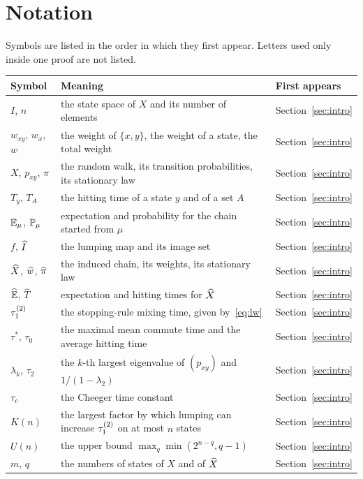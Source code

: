 \section{Notation}\label{app:notation}
Symbols are listed in the order in which they first appear. Letters used only inside one proof are not listed.

\medskip
\begin{center}
\small
\begin{tabular}{@{}lp{}l@{}}
\toprule
Symbol & Meaning & First appears\\
\midrule
$I$, $n$ & the state space of $X$ and its number of elements & Section~\ref{sec:intro}\\
$w_{xy}$, $w_x$, $w$ & the weight of $\{x,y\}$, the weight of a state, the total weight & Section~\ref{sec:intro}\\
$X$, $p_{xy}$, $\pi$ & the random walk, its transition probabilities, its stationary law & Section~\ref{sec:intro}\\
$T_y$, $T_A$ & the hitting time of a state $y$ and of a set $A$ & Section~\ref{sec:intro}\\
$\mathbb{E}_\mu$, $\mathbb{P}_\mu$ & expectation and probability for the chain started from $\mu$ & Section~\ref{sec:intro}\\
$f$, $\widehat{I}$ & the lumping map and its image set & Section~\ref{sec:intro}\\
$\widehat{X}$, $\widehat{w}$, $\widehat{\pi}$ & the induced chain, its weights, its stationary law & Section~\ref{sec:intro}\\
$\widehat{\mathbb{E}}$, $\widehat T$ & expectation and hitting times for $\widehat{X}$ & Section~\ref{sec:intro}\\
$\tau_1^{(2)}$ & the stopping-rule mixing time, given by~\eqref{eq:lw} & Section~\ref{sec:intro}\\
$\tau^*$, $\tau_0$ & the maximal mean commute time and the average hitting time & Section~\ref{sec:intro}\\
$\lambda_k$, $\tau_2$ & the $k$-th largest eigenvalue of $(p_{xy})$ and $1/(1-\lambda_2)$ & Section~\ref{sec:intro}\\
$\tau_c$ & the Cheeger time constant & Section~\ref{sec:intro}\\
$K(n)$ & the largest factor by which lumping can increase $\tau_1^{(2)}$ on at most $n$ states & Section~\ref{sec:intro}\\
$U(n)$ & the upper bound $\max_q\min(2^{n-q},q-1)$ & Section~\ref{sec:intro}\\
$m$, $q$ & the numbers of states of $X$ and of $\widehat{X}$ & Section~\ref{sec:intro}\\

\end{tabular}
\end{center}
